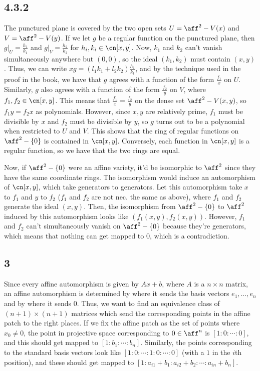 \documentclass{article}
\begin{document}
\subsection*{4.3.2}
The punctured plane is covered by the two open sets $U=\aff^2-V(x)$ and $V=\aff^2-V(y)$. If we let $g$ be a regular function on the punctured plane, then $g|_U=\frac{h_1}{k_1}$ and $g|_V=\frac{h_2}{k_2}$ for $h_i,k_i\in\cn[x,y]$. Now, $k_1$ and $k_2$ can't vanish simultaneously anywhere but $(0,0)$, so the ideal $(k_1,k_2)$ must contain $(x,y)$. Thus, we can write $xg=(l_1k_1+l_2k_2)\frac{h_1}{k_1}$, and by the technique used in the proof in the book, we have that $g$ agrees with a function of the form $\frac{f_1}{x}$ on $U$. Similarly, $g$ also agrees with a function of the form $\frac{f_2}{y}$ on $V$, where $f_1,f_2\in\cn[x,y]$. This means that $\frac{f_1}{x}=\frac{f_2}{y}$ on the dense set $\aff^2-V(x,y)$, so $f_1y=f_2x$ as polynomials. However, since $x,y$ are relatively prime, $f_1$ must be divisible by $x$ and $f_2$ must be divisible by $y$, so $g$ turns out to be a polynomial when restricted to $U$ and $V$. This shows that the ring of regular functions on $\aff^2-\{0\}$ is contained in $\cn[x,y]$. Conversely, each function in $\cn[x,y]$ is a regular function, so we have that the two rings are equal. 

Now, if $\aff^2-\{0\}$ were an affine variety, it'd be isomorphic to $\aff^2$ since they have the same coordinate rings. The isomorphism would induce an automorphism of $\cn[x,y]$, which take generators to generators. Let this automorphism take $x$ to $f_1$ and $y$ to $f_2$ ($f_1$ and $f_2$ are not nec. the same as above), where $f_1$ and $f_2$ generate the ideal $(x,y)$. Then, the isomorphism from $\aff^2-\{0\}$ to $\aff^2$ induced by this automorphism looks like $(f_1(x,y),f_2(x,y))$. However, $f_1$ and $f_2$ can't simultaneously vanish on $\aff^2-\{0\}$ because they're generators, which means that nothing can get mapped to $0$, which is a contradiction.
\subsection*{3}
Since every affine automorphism is given by $Ax+b$, where $A$ is a $n\times n$ matrix, an affine automorphism is determined by where it sends the basis vectors $e_1,\ldots,e_n$ and by where it sends $0$. Thus, we want to find an equivalence class of $(n+1)\times(n+1)$ matrices which send the corresponding points in the affine patch to the right places. If we fix the affine patch as the set of points where $x_0\neq0$, the point in projective space corresponding to $0\in\aff^n$ is $[1:0:\cdots:0]$, and this should get mapped to $[1:b_1:\cdots:b_n]$. Similarly, the points corresponding to the standard basis vectors look like $[1:0:\cdots:1:0:\cdots:0]$ (with a $1$ in the $i$th position), and these should get mapped to $[1:a_{i1}+b_1:a_{i2}+b_2:\cdots:a_{in}+b_n]$. 
\end{document}
